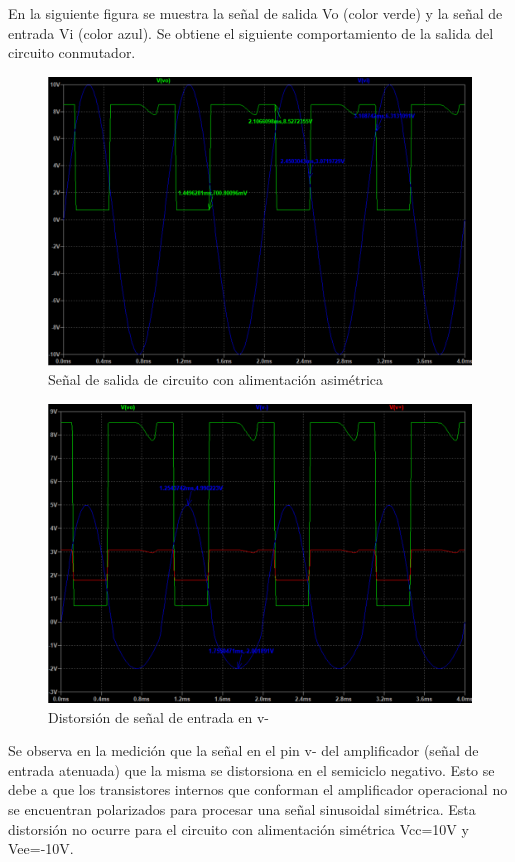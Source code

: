  En la siguiente figura se muestra la señal de salida Vo (color verde)  y la señal de entrada Vi (color azul). Se obtiene el siguiente comportamiento de la salida del circuito conmutador.
\begin{figure}[h!]
    \centering
    \includegraphics[width=1.0\linewidth]{Secciones/Circuito4/Circuito 4 - Simulación con alimentación asimétrica.png}
    \caption{Señal de salida de circuito con alimentación asimétrica}
    \label{fig:SimulacionConAlimentacionAsimetrica}
\end{figure}
\begin{figure}[h!]
    \centering
    \includegraphics[width=1.0\linewidth]{Secciones/Circuito4/Circuito 4 - Vi atenuada.png}
    \caption{Distorsión de señal de entrada en v-}
    \label{fig:ViAtenuada}
\end{figure}
Se observa en la medición que la señal en el pin v- del amplificador (señal de entrada atenuada) que la misma se distorsiona en el semiciclo negativo. Esto se debe a que los transistores internos que conforman el amplificador operacional no se encuentran polarizados para procesar una señal sinusoidal simétrica.  Esta distorsión no ocurre para el circuito con alimentación simétrica Vcc=10V y Vee=-10V.

